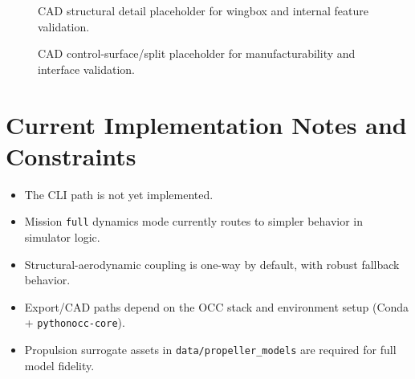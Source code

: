 ﻿\documentclass[11pt]{article}
\begin{document}
\begin{figure}[h]
\centering
{}
\caption{CAD structural detail placeholder for wingbox and internal feature validation.}
\label{fig:cad-structure-detail}
\end{figure}

\begin{figure}[h]
\centering
{}
\caption{CAD control-surface/split placeholder for manufacturability and interface validation.}
\label{fig:cad-control-split}
\end{figure}

\section{Current Implementation Notes and Constraints}
\begin{itemize}
\item The CLI path is not yet implemented.
\item Mission \texttt{full} dynamics mode currently routes to simpler behavior in simulator logic.
\item Structural-aerodynamic coupling is one-way by default, with robust fallback behavior.
\item Export/CAD paths depend on the OCC stack and environment setup (Conda + \texttt{pythonocc-core}).
\item Propulsion surrogate assets in \texttt{data/propeller\_models} are required for full model fidelity.
\end{itemize}
\end{document}

